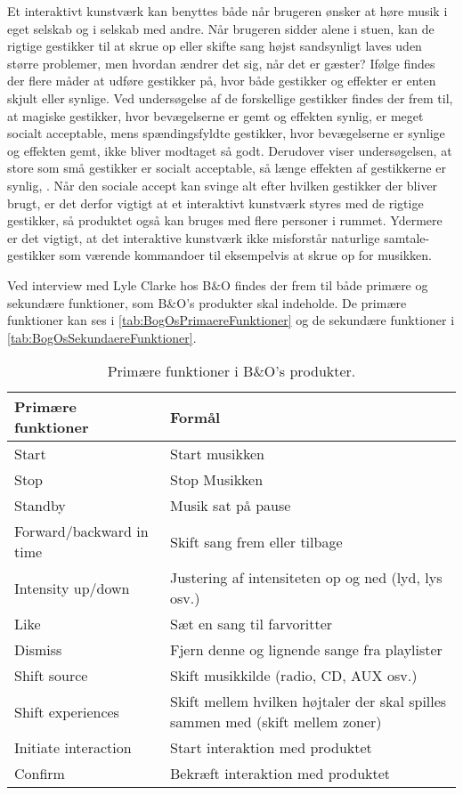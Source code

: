 Et interaktivt kunstværk kan benyttes både  når brugeren ønsker at høre musik i eget selskab og i selskab med andre. Når brugeren sidder alene i stuen, kan de rigtige gestikker til at skrue op eller skifte sang højst sandsynligt laves uden større problemer, men hvordan ændrer det sig, når det er gæster? Ifølge \textcite[ss. 276-277]{PDF:WouldYouDoThat} findes der flere måder at udføre gestikker på, hvor både gestikker og effekter er enten skjult eller synlige. Ved undersøgelse af de forskellige gestikker findes der frem til, at magiske gestikker, hvor bevægelserne er gemt og effekten synlig, er meget socialt acceptable, mens spændingsfyldte gestikker, hvor bevægelserne er synlige og effekten gemt, ikke bliver modtaget så godt. Derudover viser undersøgelsen, at store som små gestikker er socialt acceptable, så længe effekten af gestikkerne er synlig, \parencite[s. 278]{PDF:WouldYouDoThat}. Når den sociale accept kan svinge alt efter hvilken gestikker der bliver brugt, er det derfor vigtigt at et interaktivt kunstværk styres med de rigtige gestikker, så produktet også kan bruges med flere personer i rummet. Ydermere er det vigtigt, at det interaktive kunstværk ikke misforstår naturlige samtale-gestikker som værende kommandoer til eksempelvis at skrue op for musikken. 

Ved interview med Lyle Clarke hos B$\&$O findes der frem til både primære og sekundære funktioner, som B$\&$O's produkter skal indeholde. De primære funktioner kan ses i \autoref{tab:BogOsPrimaereFunktioner} og de sekundære funktioner i \autoref{tab:BogOsSekundaereFunktioner}.

%
\begin{table}[H]
	\centering
	\begin{tabular}{ | l | p{8cm} |}
		\hline
		\multicolumn{1}{|l|}{\textbf{Primære funktioner}} & \multicolumn{1}{l|}{\textbf{Formål}} \\ \hline
		Start & Start musikken \\ \hline
		Stop & Stop Musikken \\ \hline
		Standby & Musik sat på pause \\ \hline
		Forward/backward in time & Skift sang frem eller tilbage \\ \hline
		Intensity up/down & Justering af intensiteten op og ned (lyd, lys osv.) \\ \hline
		Like & Sæt en sang til farvoritter \\ \hline
		Dismiss & Fjern denne og lignende sange fra playlister \\ \hline
		Shift source & Skift musikkilde (radio, CD, AUX osv.) \\ \hline
		Shift experiences & Skift mellem hvilken højtaler der skal spilles sammen med (skift mellem zoner) \\ \hline
		Initiate interaction & Start interaktion med produktet \\ \hline
		Confirm & Bekræft interaktion med produktet \\ \hline
	\end{tabular}
	\caption{Primære funktioner i B$\&$O's produkter.}
	\label{tab:BogOsPrimaereFunktioner}
\end{table}
\noindent
%

